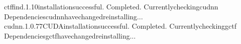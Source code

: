 \documentclass[a4paper,10pt,english]{sphinxmanual}
\begin{document}
\begin{sphinxVerbatim}[commandchars=\\\{\}]
ctffind.1.10installationsuccessful.
\PYGZhy{}\PYGZhy{}\PYGZhy{}\PYGZhy{}\PYGZhy{}\PYGZhy{}\PYGZhy{}\PYGZhy{}\PYGZhy{}\PYGZhy{}\PYGZhy{}\PYGZhy{}\PYGZhy{}\PYGZhy{}\PYGZhy{}\PYGZhy{}\PYGZhy{}\PYGZhy{}\PYGZhy{}\PYGZhy{}\PYGZhy{}\PYGZhy{}\PYGZhy{}\PYGZhy{}\PYGZhy{}\PYGZhy{}\PYGZhy{}\PYGZhy{}\PYGZhy{}\PYGZhy{}\PYGZhy{}\PYGZhy{}\PYGZhy{}\PYGZhy{}\PYGZhy{}\PYGZhy{}\PYGZhy{}\PYGZhy{}\PYGZhy{}\PYGZhy{}\PYGZhy{}\PYGZhy{}\PYGZhy{}\PYGZhy{}\PYGZhy{}\PYGZhy{}\PYGZhy{}\PYGZhy{}\PYGZhy{}\PYGZhy{}\PYGZhy{}\PYGZhy{}\PYGZhy{}\PYGZhy{}\PYGZhy{}\PYGZhy{}\PYGZhy{}\PYGZhy{}\PYGZhy{}\PYGZhy{}\PYGZhy{}\PYGZhy{}\PYGZhy{}\PYGZhy{}\PYGZhy{}\PYGZhy{}\PYGZhy{}\PYGZhy{}\PYGZhy{}\PYGZhy{}\PYGZhy{}\PYGZhy{}
Completed.
Currentlycheckingcudnn
Dependenciescudnnhavechanged\PYGZhy{}reinstalling...
\PYGZhy{}\PYGZhy{}\PYGZhy{}\PYGZhy{}\PYGZhy{}\PYGZhy{}\PYGZhy{}\PYGZhy{}\PYGZhy{}\PYGZhy{}\PYGZhy{}\PYGZhy{}\PYGZhy{}\PYGZhy{}\PYGZhy{}\PYGZhy{}\PYGZhy{}\PYGZhy{}\PYGZhy{}\PYGZhy{}\PYGZhy{}\PYGZhy{}\PYGZhy{}\PYGZhy{}\PYGZhy{}\PYGZhy{}\PYGZhy{}\PYGZhy{}\PYGZhy{}\PYGZhy{}\PYGZhy{}\PYGZhy{}\PYGZhy{}\PYGZhy{}\PYGZhy{}\PYGZhy{}\PYGZhy{}\PYGZhy{}\PYGZhy{}\PYGZhy{}\PYGZhy{}\PYGZhy{}\PYGZhy{}\PYGZhy{}\PYGZhy{}\PYGZhy{}\PYGZhy{}\PYGZhy{}\PYGZhy{}\PYGZhy{}\PYGZhy{}\PYGZhy{}\PYGZhy{}\PYGZhy{}\PYGZhy{}\PYGZhy{}\PYGZhy{}\PYGZhy{}\PYGZhy{}\PYGZhy{}\PYGZhy{}\PYGZhy{}\PYGZhy{}\PYGZhy{}\PYGZhy{}\PYGZhy{}\PYGZhy{}\PYGZhy{}\PYGZhy{}\PYGZhy{}\PYGZhy{}\PYGZhy{}
cudnn.1.0.77CUDAinstallationsuccessful.
\PYGZhy{}\PYGZhy{}\PYGZhy{}\PYGZhy{}\PYGZhy{}\PYGZhy{}\PYGZhy{}\PYGZhy{}\PYGZhy{}\PYGZhy{}\PYGZhy{}\PYGZhy{}\PYGZhy{}\PYGZhy{}\PYGZhy{}\PYGZhy{}\PYGZhy{}\PYGZhy{}\PYGZhy{}\PYGZhy{}\PYGZhy{}\PYGZhy{}\PYGZhy{}\PYGZhy{}\PYGZhy{}\PYGZhy{}\PYGZhy{}\PYGZhy{}\PYGZhy{}\PYGZhy{}\PYGZhy{}\PYGZhy{}\PYGZhy{}\PYGZhy{}\PYGZhy{}\PYGZhy{}\PYGZhy{}\PYGZhy{}\PYGZhy{}\PYGZhy{}\PYGZhy{}\PYGZhy{}\PYGZhy{}\PYGZhy{}\PYGZhy{}\PYGZhy{}\PYGZhy{}\PYGZhy{}\PYGZhy{}\PYGZhy{}\PYGZhy{}\PYGZhy{}\PYGZhy{}\PYGZhy{}\PYGZhy{}\PYGZhy{}\PYGZhy{}\PYGZhy{}\PYGZhy{}\PYGZhy{}\PYGZhy{}\PYGZhy{}\PYGZhy{}\PYGZhy{}\PYGZhy{}\PYGZhy{}\PYGZhy{}\PYGZhy{}\PYGZhy{}\PYGZhy{}\PYGZhy{}\PYGZhy{}
Completed.
Currentlycheckinggctf
Dependenciesgctfhavechanged\PYGZhy{}reinstalling...

\end{sphinxVerbatim}
\end{document}
